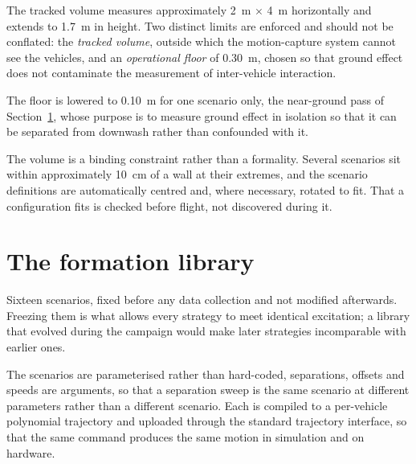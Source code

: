 The tracked volume measures approximately \SI{2}{\metre} $\times$ \SI{4}{\metre} horizontally and
extends to \SI{1.7}{\metre} in height. Two distinct limits are enforced and should not be
conflated: the \emph{tracked volume}, outside which the motion-capture system cannot see the
vehicles, and an \emph{operational floor} of \SI{0.30}{\metre}, chosen so that ground effect does
not contaminate the measurement of inter-vehicle interaction.

The floor is lowered to \SI{0.10}{\metre} for one scenario only, the near-ground pass of
Section~\ref{sec:setup-scenarios}, whose purpose is to measure ground effect in isolation so that
it can be separated from downwash rather than confounded with it.

The volume is a binding constraint rather than a formality. Several scenarios sit within
approximately \SI{10}{\centi\metre} of a wall at their extremes, and the scenario definitions are
automatically centred and, where necessary, rotated to fit. That a configuration fits is checked
before flight, not discovered during it.


\section{The formation library}
\label{sec:setup-scenarios}

Sixteen scenarios, fixed before any data collection and not modified afterwards. Freezing them is
what allows every strategy to meet identical excitation; a library that evolved during the campaign
would make later strategies incomparable with earlier ones.

The scenarios are parameterised rather than hard-coded, separations, offsets and speeds are
arguments, so that a separation sweep is the same scenario at different parameters rather than
a different scenario. Each is compiled to a per-vehicle polynomial trajectory and uploaded through
the standard trajectory interface, so that the same command produces the same motion in simulation
and on hardware.

